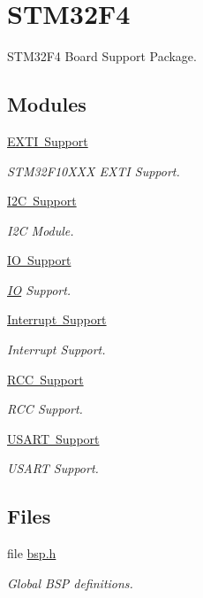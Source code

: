 \hypertarget{group__RTEMSBSPsARMSTM32F4}{}\section{S\+T\+M32\+F4}
\label{group__RTEMSBSPsARMSTM32F4}


S\+T\+M32\+F4 Board Support Package.  


\subsection*{Modules}
\begin{DoxyCompactItemize}
\item 
\mbox{\hyperlink{group__stm32f4__exti}{E\+X\+T\+I Support}}
\begin{DoxyCompactList}\small\item\em S\+T\+M32\+F10\+X\+XX E\+X\+TI Support. \end{DoxyCompactList}\item 
\mbox{\hyperlink{group__stm32f4__i2c}{I2\+C Support}}
\begin{DoxyCompactList}\small\item\em I2C Module. \end{DoxyCompactList}\item 
\mbox{\hyperlink{group__stm32f4__io}{I\+O Support}}
\begin{DoxyCompactList}\small\item\em \mbox{\hyperlink{structIO}{IO}} Support. \end{DoxyCompactList}\item 
\mbox{\hyperlink{group__stm32f4__interrupt}{Interrupt Support}}
\begin{DoxyCompactList}\small\item\em Interrupt Support. \end{DoxyCompactList}\item 
\mbox{\hyperlink{group__stm32f4__rcc}{R\+C\+C Support}}
\begin{DoxyCompactList}\small\item\em R\+CC Support. \end{DoxyCompactList}\item 
\mbox{\hyperlink{group__stm32f4__usart}{U\+S\+A\+R\+T Support}}
\begin{DoxyCompactList}\small\item\em U\+S\+A\+RT Support. \end{DoxyCompactList}\end{DoxyCompactItemize}
\subsection*{Files}
\begin{DoxyCompactItemize}
\item 
file \mbox{\hyperlink{bsps_2arm_2stm32f4_2include_2bsp_8h}{bsp.\+h}}
\begin{DoxyCompactList}\small\item\em Global B\+SP definitions. \end{DoxyCompactList}\end{DoxyCompactItemize}
